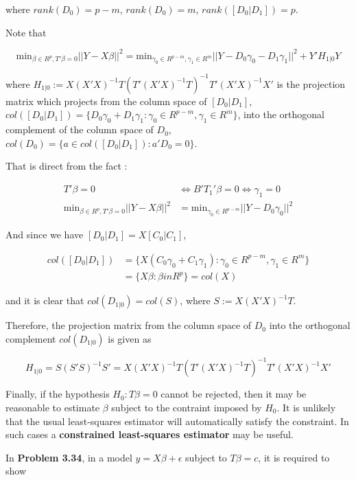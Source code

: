 \documentclass[12pt]{article}
\begin{document}
where $rank(D_0) = p - m$, $rank(D_0) = m$, $rank([D_0 | D_1]) = p$.


Note that 

$$
\mathrm{min}_{\beta \in R^p, T' \beta = 0} ||Y - X \beta||^2 
= \mathrm{min}_{\gamma_0 \in R^{p-m}, \gamma_1 \in R^m} ||Y - D_0 \gamma_0 - D_1 \gamma_1||^2 + Y' H_{1 |0} Y
$$

where $H_{1 | 0}:= X(X'X)^{-1} T (T' (X'X)^{-1} T)^{-1} T' (X'X)^{-1} X'$ is the projection matrix which projects from the column space of $[D_0 | D_1]$, $col([D_0 | D_1]) = \{ D_0 \gamma_0 + D_1 \gamma_1 : \gamma_0 \in R^{p - m}, \gamma_1 \in R^m \}$, into the orthogonal complement of the column space of $D_0$, $col(D_0) = \{a \in col([D_0 | D_1]) : a' D_0 = 0 \}$. 

That is direct from the fact : 

$$
\begin{aligned}
T' \beta = 0 &\Leftrightarrow B'T_1' \beta =0 \Leftrightarrow \gamma_1 = 0 \\[10pt]
\mathrm{min}_{\beta \in R^p, T' \beta = 0} ||Y - X \beta||^2 &= \mathrm{min}_{\gamma_0 \in R^{p-m}} ||Y - D_0 \gamma_0||^2 
\end{aligned}
$$

And since we have $[D_0 | D_1] = X [C_0 | C_1]$, 

$$
\begin{aligned}
col([D_0 | D_1]) &= \{ X(C_0 \gamma_0 + C_1 \gamma_1) : \gamma_0 \in R^{p-m}, \gamma_1 \in R^m \} \\[8pt]
&= \{ X\beta : \beta in R^p \} = col(X)
\end{aligned}
$$

and it is clear that $col(D_{1|0}) = col(S)$, where $S := X (X'X)^{-1} T$. 


Therefore, the projection matrix from the column space of $D_0$ into the orthogonal complement $col(D_{1|0})$  is given as

$$
H_{1 |0} = S (S' S)^{-1} S' = X(X'X)^{-1} T (T' (X'X)^{-1} T)^{-1} T' (X'X)^{-1} X'
$$


Finally, if the hypothesis $H_0: T \beta = 0$ cannot be rejected, then it may be reasonable to estimate $\beta$ subject to the contraint imposed by $H_0$. It is unlikely that the usual least-squares estimator will automatically satisfy the constraint. In such cases a \textbf{constrained least-squares estimator} may be useful. 

In \textbf{Problem 3.34}, in a model $y = X\beta + \epsilon$ subject to $T\beta = c$, it is required to show
\end{document}

